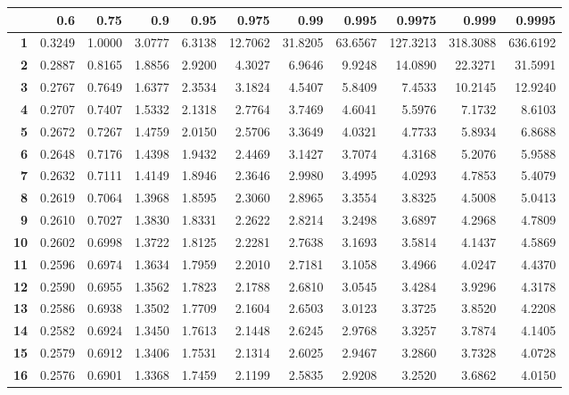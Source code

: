 \begin{table}[ht]
\centering
\begin{tabular}{rrrrrrrrrrr}
  \hline
 & \textbf{0.6} & \textbf{0.75} & \textbf{0.9} & \textbf{0.95} & \textbf{0.975} & \textbf{0.99} & \textbf{0.995} & \textbf{0.9975} & \textbf{0.999} & \textbf{0.9995} \\
  \hline
  \textbf{1 } & 0.3249 & 1.0000 & 3.0777 & 6.3138 & 12.7062 & 31.8205 & 63.6567 & 127.3213 & 318.3088 & 636.6192 \\
  \textbf{2 } & 0.2887 & 0.8165 & 1.8856 & 2.9200 & 4.3027 & 6.9646 & 9.9248 & 14.0890 & 22.3271 & 31.5991 \\
  \textbf{3 } & 0.2767 & 0.7649 & 1.6377 & 2.3534 & 3.1824 & 4.5407 & 5.8409 & 7.4533 & 10.2145 & 12.9240 \\
  \textbf{4 } & 0.2707 & 0.7407 & 1.5332 & 2.1318 & 2.7764 & 3.7469 & 4.6041 & 5.5976 & 7.1732 & 8.6103 \\
  \textbf{5 } & 0.2672 & 0.7267 & 1.4759 & 2.0150 & 2.5706 & 3.3649 & 4.0321 & 4.7733 & 5.8934 & 6.8688 \\
  \textbf{6 } & 0.2648 & 0.7176 & 1.4398 & 1.9432 & 2.4469 & 3.1427 & 3.7074 & 4.3168 & 5.2076 & 5.9588 \\
  \textbf{7 } & 0.2632 & 0.7111 & 1.4149 & 1.8946 & 2.3646 & 2.9980 & 3.4995 & 4.0293 & 4.7853 & 5.4079 \\
  \textbf{8 } & 0.2619 & 0.7064 & 1.3968 & 1.8595 & 2.3060 & 2.8965 & 3.3554 & 3.8325 & 4.5008 & 5.0413 \\
  \textbf{9 } & 0.2610 & 0.7027 & 1.3830 & 1.8331 & 2.2622 & 2.8214 & 3.2498 & 3.6897 & 4.2968 & 4.7809 \\
  \textbf{10} & 0.2602 & 0.6998 & 1.3722 & 1.8125 & 2.2281 & 2.7638 & 3.1693 & 3.5814 & 4.1437 & 4.5869 \\
  \textbf{11} & 0.2596 & 0.6974 & 1.3634 & 1.7959 & 2.2010 & 2.7181 & 3.1058 & 3.4966 & 4.0247 & 4.4370 \\
  \textbf{12} & 0.2590 & 0.6955 & 1.3562 & 1.7823 & 2.1788 & 2.6810 & 3.0545 & 3.4284 & 3.9296 & 4.3178 \\
  \textbf{13} & 0.2586 & 0.6938 & 1.3502 & 1.7709 & 2.1604 & 2.6503 & 3.0123 & 3.3725 & 3.8520 & 4.2208 \\
  \textbf{14} & 0.2582 & 0.6924 & 1.3450 & 1.7613 & 2.1448 & 2.6245 & 2.9768 & 3.3257 & 3.7874 & 4.1405 \\
  \textbf{15} & 0.2579 & 0.6912 & 1.3406 & 1.7531 & 2.1314 & 2.6025 & 2.9467 & 3.2860 & 3.7328 & 4.0728 \\
  \textbf{16} & 0.2576 & 0.6901 & 1.3368 & 1.7459 & 2.1199 & 2.5835 & 2.9208 & 3.2520 & 3.6862 & 4.0150 \\

\end{tabular}
\end{table}
